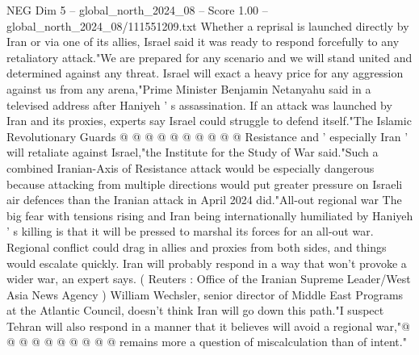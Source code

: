 \begin{textsample}{NEG Dim 5 – global\_north\_2024\_08 – Score 1.00 – global\_north\_2024\_08/111551209.txt}
Whether a reprisal is launched directly by Iran or via one of its allies, Israel said it was ready to respond forcefully to any retaliatory attack."We are prepared for any scenario and we will stand united and determined against any threat.
Israel will exact a heavy price for any aggression against us from any arena,"Prime Minister Benjamin Netanyahu said in a televised address after Haniyeh ' s assassination.
If an attack was launched by Iran and its proxies, experts say Israel could struggle to defend itself."The Islamic Revolutionary Guards @ @ @ @ @ @ @ @ @ @ Resistance and ' especially Iran ' will retaliate against Israel,"the Institute for the Study of War said."Such a combined Iranian-Axis of Resistance attack would be especially dangerous because attacking from multiple directions would put greater pressure on Israeli air defences than the Iranian attack in April 2024 did."All-out regional war The big fear with tensions rising and Iran being internationally humiliated by Haniyeh ' s killing is that it will be pressed to marshal its forces for an all-out war.
Regional conflict could drag in allies and proxies from both sides, and things would escalate quickly.
Iran will probably respond in a way that won't provoke a wider war, an expert says. ( Reuters : Office of the Iranian Supreme Leader/West Asia News Agency ) William Wechsler, senior director of Middle East Programs at the Atlantic Council, doesn't think Iran will go down this path."I suspect Tehran will also respond in a manner that it believes will avoid a regional war,"@ @ @ @ @ @ @ @ @ @ remains more a question of miscalculation than of intent."

\end{textsample}
